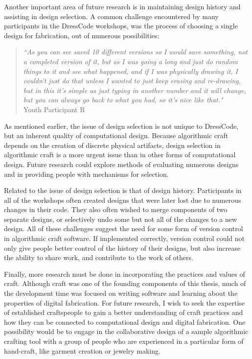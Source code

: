 Another important area of future research is in maintaining design history and assisting in design selection. A common challenge encountered by many participants in the DressCode workshops, was the process of choosing a single design for fabrication, out of numerous possibilities: 

\begin{quotation}
\textit{``As you can see saved 10 different versions so I would save something, not a completed version of it, but as I was going a long and just do random things to it and see what happened, and if I was physically drawing it, I couldn't just do that unless I wanted to just keep erasing and re-drawing, but in this it's simple as just typing in another number and it will change, but you can always go back to what you had, so it's nice like that."}
\\Youth Participant R
\end{quotation}

As mentioned earlier, the issue of design selection is not unique to DressCode, but an inherent quality of computational design. Because algorithmic craft depends on the creation of discrete physical artifacts, design selection in algorithmic craft is a more urgent issue than in other forms of computational design. Future research could explore methods of evaluating numerous designs and in providing people with mechanisms for selection. 

Related to the issue of design selection is that of design history. Participants in all of the workshops often created designs that were later lost due to numerous changes in their code. They also often wished to merge components of two separate designs, or selectively undo some but not all of the changes to a new design. All of these challenges suggest the need for some form of version control in algorithmic craft software. If implemented correctly, version control could not only give people better control of the history of their designs, but also increase the ability to share work, and contribute to the work of others.

Finally, more research must be done in incorporating the practices and values of craft. Although craft was one of the founding components of this thesis, much of the development time was focused on writing software and learning about the properties of digital fabrication. For future research, I wish to seek the expertise of established craftspeople to gain a better understanding of craft practices and how they can be connected to computational design and digital fabrication. One possibility would be to engage in the collaborative design of a sample algorithmic crafting tool with a group of people who are experienced in a particular form of hand-craft, like garment creation or jewelry making.

